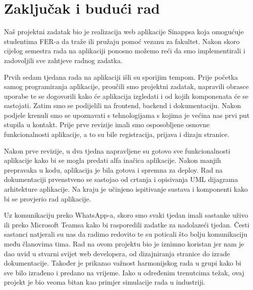 \chapter{Zaključak i budući rad}
		Naš projektni zadatak bio je realizacija web aplikacije Sinappsa koja omogućuje studentima FER-a da traže ili pružaju pomoć vezanu za fakultet. Nakon skoro cijelog semestra rada na aplikaciji ponosno možemo reći da smo implementirali i zadovoljili sve zahtjeve radnog zadatka.
		
		Prvih sedam tjedana rada na aplikaciji išli su sporijim tempom. Prije početka samog programiranja aplikacije, proučili smo projektni zadatak, napravili obrasce uporabe te se dogovorili kako će aplikacija izgledati i od kojih komponenata će se sastojati. Zatim smo se podijelili na frontend, backend i dokumentaciju. Nakon podjele krenuli smo se upoznavati s tehnologijama s kojima je većina nas prvi put stupila u kontakt. Prije prve revizije imali smo osposobljene osnovne funkcionalnosti aplikacije, a to su bile registracija, prijava i dizajn stranice.
		
		Nakon prve revizije, u dva tjedna napravljene su gotovo sve funkcionalnosti aplikacije kako bi se mogla predati alfa inačica aplikacije. Nakon manjih prepravaka u kodu, aplikacija je bila gotova i spremna za deploy. Rad na dokumentaciji prvenstveno se sastojao od crtanja i opisivanja UML dijagrama arhitekture aplikacije. Na kraju je učinjeno ispitivanje sustava i komponenti kako bi se provjerio rad aplikacije. 
		
		Uz komunikaciju preko WhatsApp-a, skoro smo svaki tjedan imali sastanke uživo ili preko Microsoft Teamsa kako bi rasporedili zadatke za nadolazeći tjedan. Česti sastanci natjerali su nas da radimo redovito te su poticali što bolju komunikaciju među članovima tima.
		Rad na ovom projektu bio je iznimno koristan jer nam je dao uvid u stvarni svijet web developera, od dizajniranja stranice do izrade dokumentacije. Također je prikazao važnost harmonijskog rada u grupi kako bi sve bilo izrađeno i predano na vrijeme. Iako u određenim trenutcima težak, ovaj projekt je bio veoma bitan kao primjer simulacije rada u industriji.
		
		\eject 
